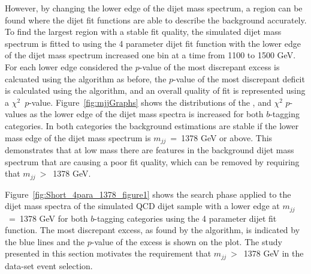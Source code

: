 However, by changing the lower edge of the dijet mass spectrum,
a region can be found where the dijet fit functions are able to describe the background accurately.
To find the largest region with a stable fit quality, the simulated dijet mass spectrum is
fitted to using the 4 parameter dijet fit function with the lower edge of the dijet mass spectrum increased one bin at a time from 1100 to 1500 GeV.
For each lower edge considered
the \mbox{$p$-value} of the most discrepant excess is calcuated using the \bh{} algorithm as before,
the \mbox{$p$-value} of the most discrepant deficit is calculated using the \dhunt{} algorithm,
and an overall quality of fit is represented using a $\chi^{2}$~\mbox{$p$-value}.
Figure~\ref{fig:mjjGraphs} shows the distributions of the
\bh{}, \dhunt{} and $\chi^{2}$ \mbox{$p$-value}s as the lower edge of the dijet mass spectra is increased
for both $b$-tagging categories.
In both categories the background estimations are stable if the lower mass edge of the dijet mass spectrum is $m_{jj}$~=~1378 GeV or above.
This demonstrates that at low mass there are features in the background dijet mass spectrum that are causing a poor fit quality,
which can be removed by requiring that $m_{jj}~>$~1378 GeV. 

Figure~\ref{fig:Short_4para_1378_figure1} shows the search phase applied to the dijet mass spectra
of the simulated QCD dijet sample with a lower edge at $m_{jj}$~=~1378 GeV for both $b$-tagging categories
 using the 4 parameter dijet fit function.
The most discrepant excess, as found by the \bh{} algorithm, is indicated by the blue lines
and the \mbox{$p$-value} of the excess is shown on the plot.
The study presented in this section motivates the requirement that $m_{jj}~>$~1378 GeV in the \summer{} data-set event selection.

